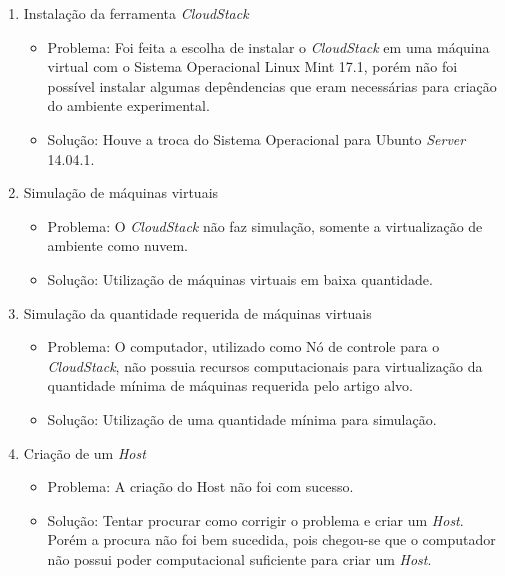 \begin{enumerate}

  \item Instalação da ferramenta \textit{CloudStack}

  \begin{itemize}
    \item Problema: Foi feita a escolha de instalar o \textit{CloudStack} em uma máquina virtual com o Sistema Operacional Linux Mint 17.1, porém não foi possível instalar algumas depêndencias que eram necessárias para criação do ambiente experimental.
    \item Solução: Houve a troca do Sistema Operacional para Ubunto \textit{Server} 14.04.1.
  \end{itemize}

  \item Simulação de máquinas virtuais
  \begin{itemize}
    \item Problema: O \textit{CloudStack} não faz simulação, somente a virtualização de ambiente como nuvem.
    \item Solução: Utilização de máquinas virtuais em baixa quantidade.
  \end{itemize}

  \item Simulação da quantidade requerida de máquinas virtuais
  \begin{itemize}
    \item Problema: O computador, utilizado como Nó de controle para o \textit{CloudStack}, não possuia recursos computacionais para virtualização da quantidade mínima de máquinas requerida pelo artigo alvo.
    \item Solução: Utilização de uma quantidade mínima para simulação.
  \end{itemize}

  \item Criação de um \textit{Host}
  \begin{itemize}
    \item Problema: A criação do Host não foi com sucesso.
    \item Solução: Tentar procurar como corrigir o problema e criar um \textit{Host}. Porém a procura não foi bem sucedida, pois chegou-se que o computador não possui poder computacional suficiente para criar um \textit{Host}.
  \end{itemize}

\end{enumerate}


\begin{comment}

  \item Instalação da ferramenta CloudStack
  \begin{itemize}
    \item Problema:
    \item Solução:
  \end{itemize}


\end{comment}
